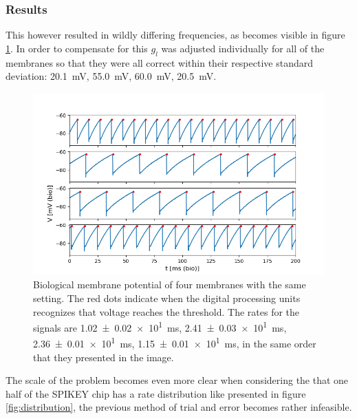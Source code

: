\documentclass[a4paper]{article}
\begin{document}
\subsubsection{Results}
This however resulted in wildly differing frequencies, as becomes visible in
figure \ref{fig:4membranes}. In order to compensate for this $g_l$ was adjusted
individually for all of the membranes so that they were all correct within their
respective standard deviation: \SI{20.1}{\milli\volt}, \SI{55.0}{\milli\volt},
\SI{60.0}{\milli\volt}, \SI{20.5}{\milli\volt}.

\begin{figure}[ht]
    \centering
    \includegraphics[width=\textwidth]{figures/4membranes.png}
    \caption{Biological membrane potential of four membranes with the same
    setting. The red dots indicate when the digital processing units recognizes
    that voltage reaches the threshold. The rates for the signals are
    \SI{1.02(2)e1}{\milli\second}, \SI{2.41(3)e1}{\milli\second},
    \SI{2.36(1)e1}{\milli\second}, \SI{1.15(1)e1}{\milli\second}, in the same
    order that they presented in the image. }
    \label{fig:4membranes}
\end{figure}

The scale of the problem becomes even more clear when considering the that one
half of the SPIKEY chip has a rate distribution like presented in figure
\ref{fig:distribution}, the previous method of trial and error becomes rather
infeasible.
\end{document}
